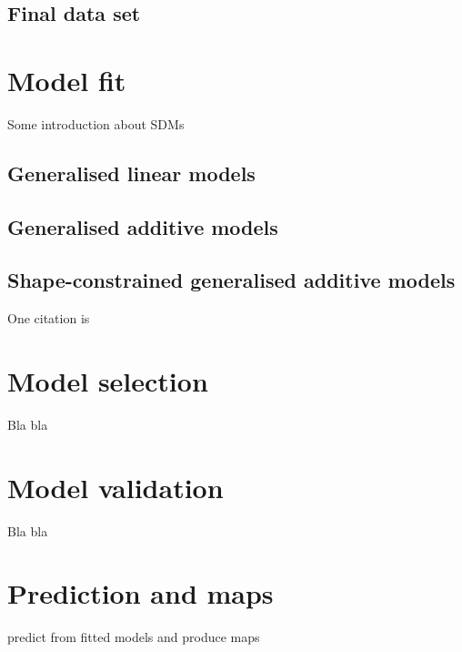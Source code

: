 \documentclass[
]{book}
\begin{document}
\hypertarget{final-data-set}{%
\section{Final data set}\label{final-data-set}}

\hypertarget{model-fit}{%
\chapter{Model fit}\label{model-fit}}

Some introduction about SDMs

\hypertarget{generalised-linear-models}{%
\section{Generalised linear models}\label{generalised-linear-models}}

\hypertarget{generalised-additive-models}{%
\section{Generalised additive models}\label{generalised-additive-models}}

\hypertarget{shape-constrained-generalised-additive-models}{%
\section{Shape-constrained generalised additive models}\label{shape-constrained-generalised-additive-models}}

One citation is \citep{citores_etal_2020}

\hypertarget{model-selection}{%
\chapter{Model selection}\label{model-selection}}

Bla bla

\hypertarget{model-validation}{%
\chapter{Model validation}\label{model-validation}}

Bla bla

\hypertarget{prediction-and-maps}{%
\chapter{Prediction and maps}\label{prediction-and-maps}}

predict from fitted models and produce maps

  
\end{document}
